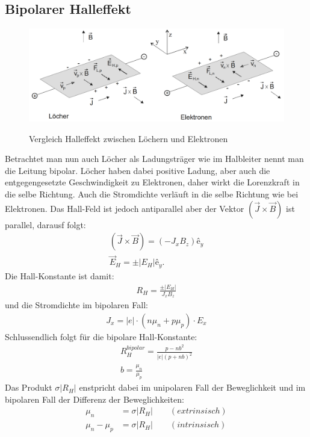 \subsection{Bipolarer Halleffekt}
\begin{figure}
    \centering
    \caption{Vergleich Halleffekt zwischen Löchern und Elektronen}
    \includegraphics[width=1.0\textwidth]{./fig/bipo_hall.png}
    \label{fig:bihl}
\end{figure}
Betrachtet man nun auch Löcher als Ladungsträger wie im Halbleiter nennt man die Leitung bipolar. Löcher haben dabei positive Ladung, aber auch die entgegengesetzte Geschwindigkeit zu Elektronen, daher wirkt die Lorenzkraft in die selbe Richtung. Auch die Stromdichte verläuft in die selbe Richtung wie bei Elektronen. Das Hall-Feld ist jedoch antiparallel aber der Vektor $( \Vec{J} \times \Vec{B} )$ ist parallel, darausf folgt:
\begin{align}
    ( \Vec{J} \times \Vec{B} ) = (-J_x B_z) ê_y \\
    \Vec{E}_H = \pm |E_H| ê_y.
\end{align}
Die Hall-Konstante ist damit:
\begin{align}
    R_H = \frac{\pm|E_H|}{J_xB_z}
\end{align}
und die Stromdichte im bipolaren Fall:
\begin{align}
    J_x = |e| \cdot (n\mu_n+p\mu_p) \cdot E_x
\end{align}
Schlussendlich folgt für die bipolare Hall-Konstante:
\begin{align}
    R_H^{bipolar} = \frac{p-nb^2}{|e|(p+nb)^2} \\
    b= \frac{\mu_n}{\mu_p}
\end{align}
Das Produkt $\sigma |R_H|$ enstpricht dabei im unipolaren Fall der Beweglichkeit und im bipolaren Fall der Differenz der Beweglichkeiten:
\begin{align}
    \mu_n &= \sigma |R_H| \qquad (extrinsisch) \\
    \mu_n - \mu_p &= \sigma |R_H| \qquad (intrinsisch)
\end{align}
